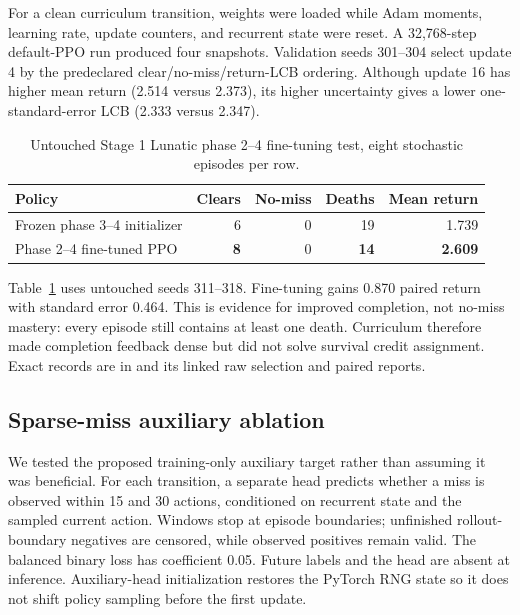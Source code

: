 \documentclass[10pt]{article}
\begin{document}
For a clean curriculum transition, weights were loaded while Adam moments,
learning rate, update counters, and recurrent state were reset.  A 32,768-step
default-PPO run produced four snapshots.  Validation seeds 301--304 select
update 4 by the predeclared clear/no-miss/return-LCB ordering.  Although update
16 has higher mean return (2.514 versus 2.373), its higher uncertainty gives a
lower one-standard-error LCB (2.333 versus 2.347).

\begin{table}[ht]
  \centering
  \caption{Untouched Stage 1 Lunatic phase 2--4 fine-tuning test, eight
  stochastic episodes per row.}
  \label{tab:phase-two}
  \begin{tabular}{lrrrr}
    \toprule
    Policy & Clears & No-miss & Deaths & Mean return \\
    \midrule
    Frozen phase 3--4 initializer & 6 & 0 & 19 & 1.739 \\
    Phase 2--4 fine-tuned PPO & \textbf{8} & 0 & \textbf{14} & \textbf{2.609} \\
    \bottomrule
  \end{tabular}
\end{table}

Table~\ref{tab:phase-two} uses untouched seeds 311--318.  Fine-tuning gains
0.870 paired return with standard error 0.464.  This is evidence for improved
completion, not no-miss mastery: every episode still contains at least one
death.  Curriculum therefore made completion feedback dense but did not solve
survival credit assignment.  Exact records are in
 and its linked raw
selection and paired reports.

\subsection{Sparse-miss auxiliary ablation}

We tested the proposed training-only auxiliary target rather than assuming it
was beneficial.  For each transition, a separate head predicts whether a miss
is observed within 15 and 30 actions, conditioned on recurrent state and the
sampled current action.  Windows stop at episode boundaries; unfinished
rollout-boundary negatives are censored, while observed positives remain valid.
The balanced binary loss has coefficient 0.05.  Future labels and the head are
absent at inference.  Auxiliary-head initialization restores the PyTorch RNG
state so it does not shift policy sampling before the first update.
\end{document}
